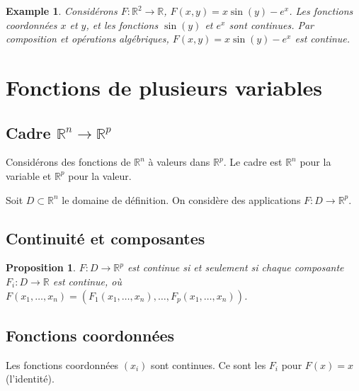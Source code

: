 \documentclass{article}
\newtheorem{proposition}{Proposition}
\newtheorem{example}{Example}
\begin{document}
\begin{example}
Considérons $F : \mathbb{R}^2 \to \mathbb{R}$, $F(x, y) = x \sin(y) - e^x$. Les fonctions coordonnées $x$ et $y$, et les fonctions $\sin(y)$ et $e^x$ sont continues. Par composition et opérations algébriques, $F(x, y) = x \sin(y) - e^x$ est continue.
\end{example}

\section{Fonctions de plusieurs variables}

\subsection{Cadre $\mathbb{R}^n \to \mathbb{R}^p$}

Considérons des fonctions de $\mathbb{R}^n$ à valeurs dans $\mathbb{R}^p$. Le cadre est $\mathbb{R}^n$ pour la variable et $\mathbb{R}^p$ pour la valeur.

Soit $D \subset \mathbb{R}^n$ le domaine de définition. On considère des applications $F : D \to \mathbb{R}^p$.

\subsection{Continuité et composantes}

\begin{proposition}
$F : D \to \mathbb{R}^p$ est continue si et seulement si chaque composante $F_i : D \to \mathbb{R}$ est continue, où $F(x_1, \dots, x_n) = (F_1(x_1, \dots, x_n), \dots, F_p(x_1, \dots, x_n))$.
\end{proposition}

\subsection{Fonctions coordonnées}

Les fonctions coordonnées $(x_i)$ sont continues. Ce sont les $F_i$ pour $F(x) = x$ (l'identité).
\end{document}
